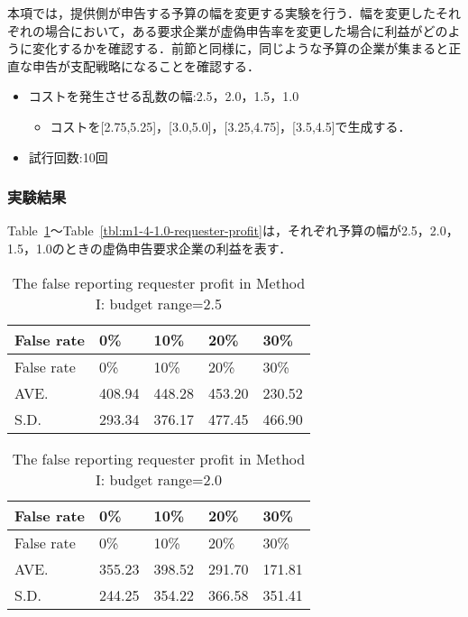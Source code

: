 本項では，提供側が申告する予算の幅を変更する実験を行う．幅を変更したそれぞれの場合において，ある要求企業が虚偽申告率を変更した場合に利益がどのように変化するかを確認する．前節と同様に，同じような予算の企業が集まると正直な申告が支配戦略になることを確認する．

\begin{itemize}
\tightlist
\item
  コストを発生させる乱数の幅:2.5，2.0，1.5，1.0

  \begin{itemize}
  \tightlist
  \item
    コストを{[}2.75,5.25{]}，{[}3.0,5.0{]}，{[}3.25,4.75{]}，{[}3.5,4.5{]}で生成する．
  \end{itemize}
\item
  試行回数:10回
\end{itemize}

\hypertarget{ux5b9fux9a13ux7d50ux679c-2}{%
\subsubsection{実験結果}\label{ux5b9fux9a13ux7d50ux679c-2}}

Table~\ref{tbl:m1-4-2.5-requester-profit}〜Table~\ref{tbl:m1-4-1.0-requester-profit}は，それぞれ予算の幅が2.5，2.0，1.5，1.0のときの虚偽申告要求企業の利益を表す．

\hypertarget{tbl:m1-4-2.5-requester-profit}{}
\begin{longtable}[H]{@{}lllll@{}}
\caption{\label{tbl:m1-4-2.5-requester-profit}The false reporting
requester profit in Method I: budget range=2.5}\tabularnewline
\toprule
False rate & 0\% & 10\% & 20\% & 30\%\tabularnewline
\midrule
\endfirsthead
\toprule
False rate & 0\% & 10\% & 20\% & 30\%\tabularnewline
\midrule
\endhead
AVE. & 408.94 & 448.28 & 453.20 & 230.52\tabularnewline
S.D. & 293.34 & 376.17 & 477.45 & 466.90\tabularnewline
\bottomrule
\end{longtable}

\hypertarget{tbl:m1-4-2.0-requester-profit}{}
\begin{longtable}[H]{@{}lllll@{}}
\caption{\label{tbl:m1-4-2.0-requester-profit}The false reporting
requester profit in Method I: budget range=2.0}\tabularnewline
\toprule
False rate & 0\% & 10\% & 20\% & 30\%\tabularnewline
\midrule
\endfirsthead
\toprule
False rate & 0\% & 10\% & 20\% & 30\%\tabularnewline
\midrule
\endhead
AVE. & 355.23 & 398.52 & 291.70 & 171.81\tabularnewline
S.D. & 244.25 & 354.22 & 366.58 & 351.41\tabularnewline
\bottomrule
\end{longtable}

